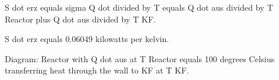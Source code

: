 S dot erz equals sigma Q dot divided by T equals Q dot aus divided by T Reactor plus Q dot aus divided by T KF.  

S dot erz equals 0.06049 kilowatts per kelvin.  

Diagram: Reactor with Q dot aus at T Reactor equals 100 degrees Celsius transferring heat through the wall to KF at T KF.